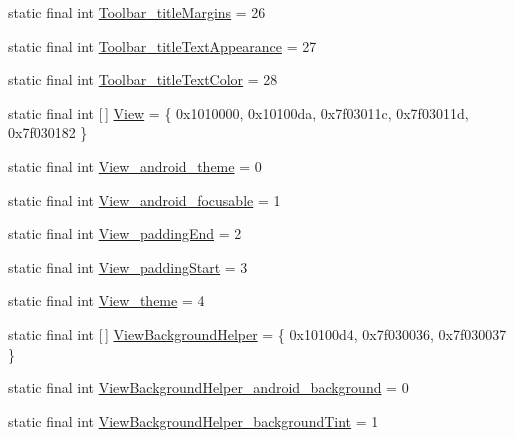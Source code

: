 \begin{DoxyCompactItemize}
\item 
static final int \mbox{\hyperlink{classcom_1_1synnapps_1_1carouselview_1_1_r_1_1styleable_aa29ca97dfb35d37fb540baa75a8c6a58}{Toolbar\+\_\+title\+Margins}} = 26
\item 
static final int \mbox{\hyperlink{classcom_1_1synnapps_1_1carouselview_1_1_r_1_1styleable_ab64cfc1c848c9fc71af9b686e14ac416}{Toolbar\+\_\+title\+Text\+Appearance}} = 27
\item 
static final int \mbox{\hyperlink{classcom_1_1synnapps_1_1carouselview_1_1_r_1_1styleable_aee73fb87df05dbba2e09c4833e0d2823}{Toolbar\+\_\+title\+Text\+Color}} = 28
\item 
static final int \mbox{[}$\,$\mbox{]} \mbox{\hyperlink{classcom_1_1synnapps_1_1carouselview_1_1_r_1_1styleable_aa716919fe40eef43b1b9ea5af9014d57}{View}} = \{ 0x1010000, 0x10100da, 0x7f03011c, 0x7f03011d, 0x7f030182 \}
\item 
static final int \mbox{\hyperlink{classcom_1_1synnapps_1_1carouselview_1_1_r_1_1styleable_a5912449e5a539894e8f8bb32db705dbb}{View\+\_\+android\+\_\+theme}} = 0
\item 
static final int \mbox{\hyperlink{classcom_1_1synnapps_1_1carouselview_1_1_r_1_1styleable_a1a72bb55d90d1650f1e0d843ac7efccb}{View\+\_\+android\+\_\+focusable}} = 1
\item 
static final int \mbox{\hyperlink{classcom_1_1synnapps_1_1carouselview_1_1_r_1_1styleable_a342ee59423381014fac62c04df053ef2}{View\+\_\+padding\+End}} = 2
\item 
static final int \mbox{\hyperlink{classcom_1_1synnapps_1_1carouselview_1_1_r_1_1styleable_a9bdc8d11c782b37d5c95b348d670768c}{View\+\_\+padding\+Start}} = 3
\item 
static final int \mbox{\hyperlink{classcom_1_1synnapps_1_1carouselview_1_1_r_1_1styleable_aef36f72fd1603116a368f4f63449f72c}{View\+\_\+theme}} = 4
\item 
static final int \mbox{[}$\,$\mbox{]} \mbox{\hyperlink{classcom_1_1synnapps_1_1carouselview_1_1_r_1_1styleable_a52f6d6fce25e7998ff02d53c5e65f4ae}{View\+Background\+Helper}} = \{ 0x10100d4, 0x7f030036, 0x7f030037 \}
\item 
static final int \mbox{\hyperlink{classcom_1_1synnapps_1_1carouselview_1_1_r_1_1styleable_ae9504eb3965cbeebf21d3a0c41b80b6a}{View\+Background\+Helper\+\_\+android\+\_\+background}} = 0
\item 
static final int \mbox{\hyperlink{classcom_1_1synnapps_1_1carouselview_1_1_r_1_1styleable_a180049ae8e3263f8e38ada80133788a2}{View\+Background\+Helper\+\_\+background\+Tint}} = 1

\end{DoxyCompactItemize}
